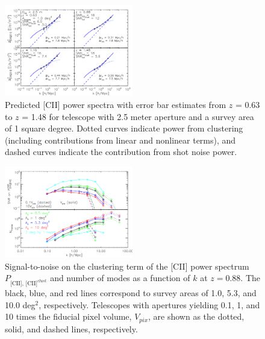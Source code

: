 \documentclass[12pt,preprint]{emulateapj}
\begin{document}

\begin{figure}[h]
\centering
\includegraphics[width = 0.5\textwidth]{pcii_STARFIRE_z63_z88_z116_z148_halofit_bethermin_spinoglio_ap2p5m_1sqdeg_uhp_ktnonzero}
\caption{Predicted [CII] power spectra with error bar estimates from $z$ = 0.63 to $z$ = 1.48 for telescope with 2.5 meter aperture and a survey area of 1 square degree. Dotted curves indicate power from clustering (including contributions from linear and nonlinear terms), and dashed curves indicate the contribution from shot noise power.}
\label{fig:pcii_zall}
\end{figure}

\begin{figure}[h]
\centering
\includegraphics[width=0.5\textwidth]{snr_nmode_vs_k_starfire_ap2p5m_0p1vpix_10vpix_1sqdeg_5p3sqdeg_10sqdeg_ktnonzero}
\caption{Signal-to-noise on the clustering term of the [CII] power spectrum $P_{\textrm{[CII], [CII]}^{clust}}$ and number of modes as a function of $k$ at $z=0.88$. The black, blue, and red lines correspond to survey areas of 1.0, 5.3, and 10.0 deg$^2$, respectively. Telescopes with apertures yielding 0.1, 1, and 10 times the fiducial pixel volume, $V_{pix}$, are shown as the dotted, solid, and dashed lines, respectively.}
\label{fig:snr_nmode_k}
\end{figure}
\end{document}
